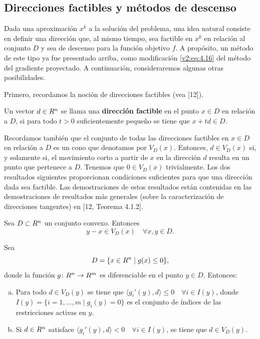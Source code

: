 
\subsection{Direcciones factibles y métodos de descenso}

Dada una aproximación $x^k$ a la solución del problema, una idea natural consiste en definir una dirección que, al mismo tiempo, sea factible en $x^k$ en relación al conjunto $D$ y sea de descenso para la función objetivo $f$. A propósito, un método de este tipo ya fue presentado arriba, como modificación \eqref{v2:eq:4.16} del método del gradiente proyectado. A continuación, consideraremos algunas otras posibilidades.

Primero, recordamos la noción de direcciones factibles (vea [12]).

\begin{definition}\label{v2:def:4.1.1}
    Un vector $d \in R^n$ se llama una \textbf{dirección factible} en el punto $x \in D$ en relación a $D$, si para todo $t > 0$ suficientemente pequeño se tiene que $x + td \in D$.
\end{definition}

Recordamos también que el conjunto de todas las direcciones factibles en $x \in D$ en relación a $D$ es un cono que denotamos por $V_D(x)$. Entonces, $d \in V_D(x)$ si, y solamente si, el movimiento corto a partir de $x$ en la dirección $d$ resulta en un punto que pertenece a $D$. Tenemos que $0 \in V_D(x)$ trivialmente. Los dos resultados siguientes proporcionan condiciones suficientes para que una dirección dada sea factible. Las demostraciones de estos resultados están contenidas en las demostraciones de resultados más generales (sobre la caracterización de direcciones tangentes) en [12, Teorema 4.1.2].

\begin{lemma}\label{v2:lem:4.1.2}
    Sea $D \subset R^n$ un conjunto convexo. Entonces
    \[
        y - x \in V_D(x) \quad \forall x, y \in D.
    \]
\end{lemma}

\begin{lemma}\label{v2:lem:4.1.3}
    Sea
    \[
        D = \{x \in R^n \mid g(x) \le 0\},
    \]
    donde la función $g \colon R^n \to R^m$ es diferenciable en el punto $y \in D$. Entonces:
    \begin{enumerate}[(a)]
        \item Para todo $d \in V_D(y)$ se tiene que $\langle g_i'(y), d \rangle \le 0 \quad \forall i \in I(y)$, donde $I(y) = \{i = 1, \dots, m \mid g_i(y) = 0\}$ es el conjunto de índices de las restricciones activas en $y$.
        \item Si $d \in R^n$ satisface $\langle g_i'(y), d \rangle < 0 \quad \forall i \in I(y)$, se tiene que $d \in V_D(y)$.
    \end{enumerate}
\end{lemma}


